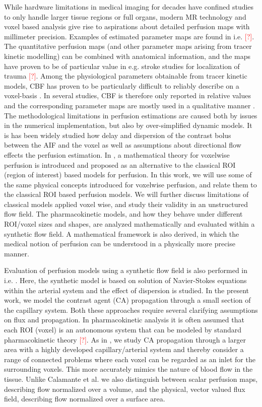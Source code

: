 \documentclass[paper=a4, fontsize=11pt,parskip=half,headings=small]{scrartcl}
\newcommand{\missingsource}{\textcolor{red}{[?]}}
\begin{document}
	While hardware limitations in medical imaging for decades have confined studies to only handle larger tissue regions or full organs, modern MR technology and voxel based analysis give rise to aspirations about detailed perfusion maps with millimeter precision.  
	Examples of estimated parameter maps are found in i.e. \missingsource. The quantitative perfusion maps (and other parameter maps arising from tracer kinetic modelling) can be combined with anatomical information, and the maps have proven to be of particular value in e.g. stroke studies for localization of trauma \missingsource. 
	Among the physiological parameters obtainable from tracer kinetic models, CBF has proven to be particularly difficult to reliably describe on a voxel-basis \cite{kudo10}.  
	In several studies, CBF is therefore only reported in relative values and the corresponding parameter maps are mostly used in a qualitative manner \cite{calamante99}.
	The methodological limitations in perfusion estimations are caused both by issues in the numerical implementation, but also by over-simplified dynamic models.  
	It is has been widely studied how delay and dispersion of the contrast bolus between the AIF and the voxel as well as assumptions about directional flow \cite{thacker03,sourbron14} effects the perfusion estimation. 
	In \cite{sourbron14}, a mathematical theory for voxelwise perfusion is introduced and proposed as an alternative to the classical ROI (region of interest) based models for perfusion. 
	In this work, we will use some of the same physical concepts introduced for voxelwise perfusion, and relate them to the classical ROI based perfusion models.  
	We will further discuss limitations of classical models applied voxel wise, and study their validity in an unstructured flow field.
	The pharmacokinetic models, and how they behave under different ROI/voxel sizes and shapes, are analyzed mathematically and evaluated within a synthetic flow field.  
	A mathematical framework is also derived, in which the medical notion of perfusion can be understood in a physically more precise manner.

	Evaluation of perfusion models using a synthetic flow field is also performed in i.e. \cite{calamante03}. 
	Here, the synthetic model is based on solution of Navier-Stokes equations within the arterial system and the effect of dispersion is studied.  
	In the present work, we model the contrast agent (CA) propagation through a small section of the capillary system. 
	Both these approaches require several clarifying assumptions on flux and propagation. 
	In pharmacokinetic analysis it is often assumed that each ROI (voxel) is an autonomous system that can be modeled by standard pharmacokinetic theory \missingsource. 
	As in \cite{calamante03}, we study CA propagation through a larger area with a highly developed capillary/arterial system and thereby consider a range of connected problems where each voxel can be regarded as an inlet for the surrounding voxels.  
This more accurately mimics the nature of blood flow in the tissue.  
	Unlike Calamante et al. \cite{calamante03} we also distinguish between scalar perfusion maps, describing flow normalized over a volume, and the physical, vector valued flux field, describing flow normalized over a surface area. 
\end{document}
